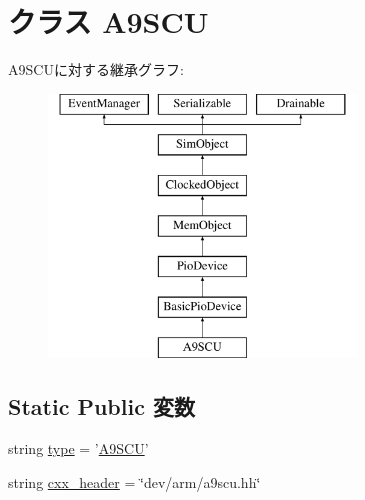 \hypertarget{classRealView_1_1A9SCU}{
\section{クラス A9SCU}
\label{classRealView_1_1A9SCU}
}
A9SCUに対する継承グラフ:\begin{figure}[H]
\begin{center}
\leavevmode
\includegraphics[height=7cm]{classRealView_1_1A9SCU}
\end{center}
\end{figure}
\subsection*{Static Public 変数}
\begin{DoxyCompactItemize}
\item 
string \hyperlink{classRealView_1_1A9SCU_acce15679d830831b0bbe8ebc2a60b2ca}{type} = '\hyperlink{classRealView_1_1A9SCU}{A9SCU}'
\item 
string \hyperlink{classRealView_1_1A9SCU_a17da7064bc5c518791f0c891eff05fda}{cxx\_\-header} = \char`\"{}dev/arm/a9scu.hh\char`\"{}
\end{DoxyCompactItemize}


